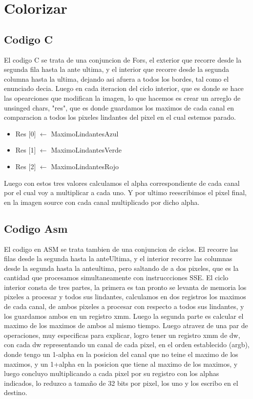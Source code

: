 \section{Colorizar}

\subsection{Codigo C}
	El codigo C se trata de una conjuncion de Fors, el exterior que recorre desde la segunda fila hasta la ante ultima,  y el interior que recorre desde la segunda columna hasta la ultima, dejando asi afuera a todos los bordes, tal como el enunciado decia. Luego en cada iteracion del ciclo interior, que es donde se hace las opearciones que modifican la imagen, lo que hacemos es crear un arreglo de unsinged chars, "res", que es  donde guardamos los maximos de cada canal en comparacion a todos  los pixeles lindantes del pixel en el cual estemos parado.
\begin{itemize}
\item {Res $[$0$]$ $\leftarrow$ MaximoLindantesAzul}
\item {Res $[$1$]$ $\leftarrow$ MaximoLindantesVerde}
\item {Res $[$2$]$ $\leftarrow$ MaximoLindantesRojo}
\end{itemize}
Luego con estos tres valores calculamos el alpha correspondiente de cada canal por el cual voy a multiplicar a cada uno. Y por ultimo reescribimos el pixel final, en la imagen source con cada canal multiplicado  por dicho alpha.

\subsection{Codigo Asm}
	El codigo en ASM se trata tambien de una conjuncion de ciclos. El recorre las filas desde la segunda hasta la anteUltima, y el interior recorre las columnas desde la segunda hasta la anteultima, pero saltando de a dos pixeles, que es la cantidad que procesamos simultaneamente con instruccciones SSE. 
    El ciclo interior consta de tres partes, la primera es tan pronto se levanta de memoria los pixeles a procesar y todos sus lindantes, calculamos en dos registros los maximos de cada canal, de ambos pixeles a procesar con respecto a todos sus lindantes, y los guardamos ambos en un registro xmm. Luego la segunda parte es calcular el maximo de los maximos de ambos al mismo tiempo. Luego atravez de una par de operaciones, muy especificas para explicar, logro tener un registro xmm de dw, con cada dw representando un canal de cada pixel, en el orden establecido (argb), donde tengo un 1-alpha en la posicion del canal que no teine el maximo de los maximos, y un 1+alpha en la posicion que tiene al maximo de los maximos, y luego concluyo multiplicando a cada pixel por su registro con los alphas indicados, lo reduzco a tamaño de 32 bits por pixel, los uno y los escribo en el destino.
	
